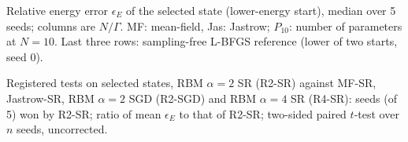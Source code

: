 \begin{table}[t]\centering\caption{Relative energy error $\epsilon_E$ of the selected state (lower-energy start), median over 5 seeds; columns are $N/\Gamma$. MF: mean-field, Jas: Jastrow; $P_{10}$: number of parameters at $N{=}10$. Last three rows: sampling-free L-BFGS reference (lower of two starts, seed 0).}\label{tab:energy}\footnotesize\setlength{\tabcolsep}{4pt}\end{table}

\begin{table}[t]\centering\caption{Registered tests on selected states, RBM $\alpha{=}2$ SR (R2-SR) against MF-SR, Jastrow-SR, RBM $\alpha{=}2$ SGD (R2-SGD) and RBM $\alpha{=}4$ SR (R4-SR): seeds (of 5) won by R2-SR; ratio of mean $\epsilon_E$ to that of R2-SR; two-sided paired $t$-test over $n$ seeds, uncorrected.}\label{tab:wins}\footnotesize\setlength{\tabcolsep}{4pt}\end{table}

